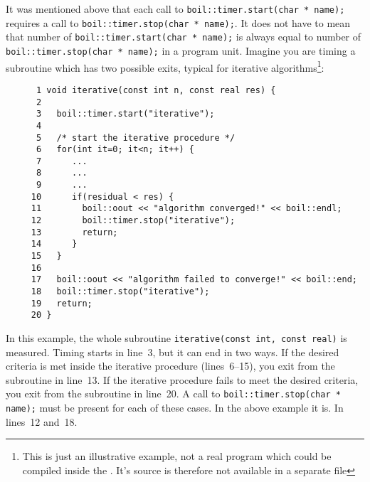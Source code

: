 It was mentioned above that each call to {\tt boil::timer.start(char * name);} 
requires a call to {\tt boil::timer.stop(char * name);}. It does not have to
mean that number of {\tt boil::timer.start(char * name);} is always equal
to number of {\tt boil::timer.stop(char * name);} in a program unit. Imagine
you are timing a subroutine which has two possible exits, typical for iterative 
algorithms\footnote{This is just an illustrative example, not a real program
which could be compiled inside the {\psiboil}. It's source is therefore not 
available in a separate file}:
%
{\small \begin{verbatim}
      1 void iterative(const int n, const real res) {
      2
      3   boil::timer.start("iterative");
      4
      5   /* start the iterative procedure */
      6   for(int it=0; it<n; it++) {
      7      ...
      8      ...
      9      ...
     10      if(residual < res) {        
     11        boil::oout << "algorithm converged!" << boil::endl;
     12        boil::timer.stop("iterative");
     13        return;
     14      }
     15   }
     16
     17   boil::oout << "algorithm failed to converge!" << boil::end;
     18   boil::timer.stop("iterative");
     19   return;
     20 }
\end{verbatim}}
%
In this example, the whole subroutine {\tt iterative(const int, const real)}
is measured. Timing starts in line~3, but it can end in two ways. If the desired
criteria is met inside the iterative procedure (lines~6--15), you exit from the 
subroutine in line~13. If the iterative procedure fails to meet the desired
criteria, you exit from the subroutine in line~20. A call to 
{\tt boil::timer.stop(char * name);} must be present for each of these cases.
In the above example it is. In lines~12 and~18. 

\vspace*{5mm}  %
